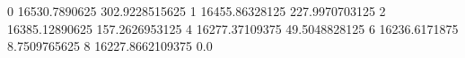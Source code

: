 0 16530.7890625 302.9228515625
1 16455.86328125 227.9970703125
2 16385.12890625 157.2626953125
4 16277.37109375 49.5048828125
6 16236.6171875 8.7509765625
8 16227.8662109375 0.0
